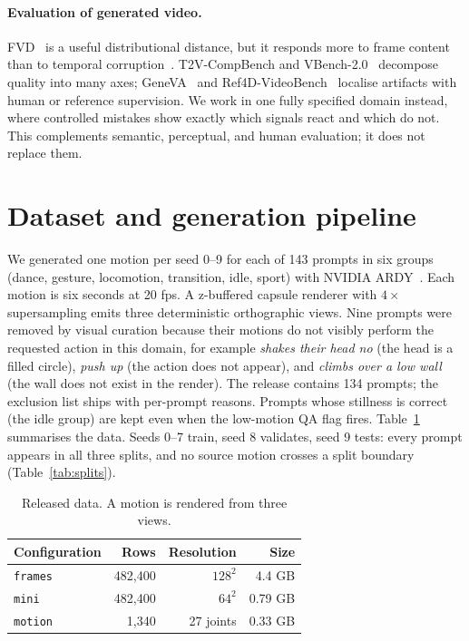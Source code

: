 \documentclass[10pt,twocolumn]{article}
\begin{document}
\paragraph{Evaluation of generated video.} FVD~\cite{unterthiner2018fvd} is a useful distributional distance,
but it responds more to frame content than to temporal corruption~\cite{ge2024fvdbias}. T2V-CompBench and
VBench-2.0~\cite{sun2025compbench,zheng2025vbench2} decompose quality into many axes; GeneVA~\cite{kang2026geneva}
and Ref4D-VideoBench~\cite{wei2026ref4d} localise artifacts with human or reference supervision. We work in one
fully specified domain instead, where controlled mistakes show exactly which signals react and which do not.
This complements semantic, perceptual, and human evaluation; it does not replace them.

\section{Dataset and generation pipeline}
We generated one motion per seed 0--9 for each of 143 prompts in six groups (dance, gesture, locomotion,
transition, idle, sport) with NVIDIA ARDY~\cite{zhao2026ardy}. Each motion is six seconds at 20 fps. A
z-buffered capsule renderer with $4\times$ supersampling emits three deterministic orthographic views. Nine
prompts were removed by visual curation because their motions do not visibly perform the requested action in
this domain, for example \emph{shakes their head no} (the head is a filled circle), \emph{push up} (the action
does not appear), and \emph{climbs over a low wall} (the wall does not exist in the render). The release
contains 134 prompts; the exclusion list ships with per-prompt reasons. Prompts whose stillness is correct (the
idle group) are kept even when the low-motion QA flag fires. Table~\ref{tab:data} summarises the data. Seeds
0--7 train, seed 8 validates, seed 9 tests: every prompt appears in all three splits, and no source motion
crosses a split boundary (Table~\ref{tab:splits}).

\begin{table}[t]\centering\caption{Released data. A motion is rendered from three views.}\label{tab:data}\small
\begin{tabular}{@{}lrrr@{}}\toprule Configuration & Rows & Resolution & Size \\\midrule
\texttt{frames} & 482,400 & $128^2$ & 4.4 GB \\
\texttt{mini} & 482,400 & $64^2$ & 0.79 GB \\
\texttt{motion} & 1,340 & 27 joints & 0.33 GB \\\bottomrule\end{tabular}\end{table}
\end{document}
